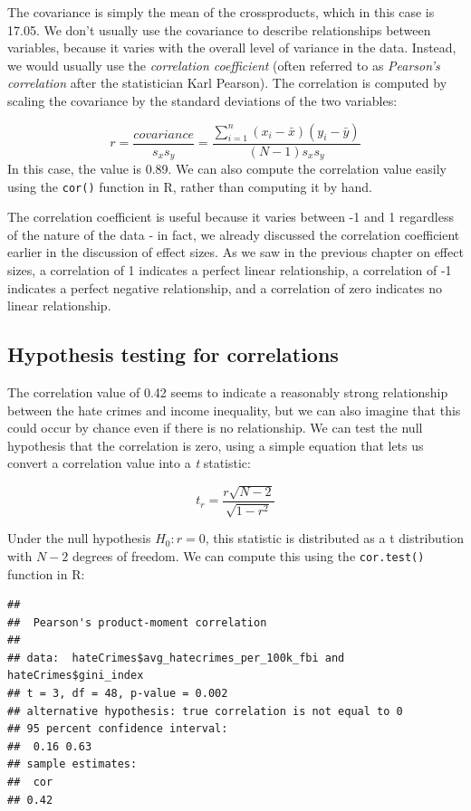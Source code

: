 \documentclass[12pt,]{book}
\theoremstyle{definition}
\theoremstyle{definition}
\theoremstyle{definition}
\theoremstyle{remark}
\begin{document}
The covariance is simply the mean of the crossproducts, which in this case is 17.05. We don't usually use the covariance to describe relationships between variables, because it varies with the overall level of variance in the data. Instead, we would usually use the \emph{correlation coefficient} (often referred to as \emph{Pearson's correlation} after the statistician Karl Pearson). The correlation is computed by scaling the covariance by the standard deviations of the two variables:

\[
r = \frac{covariance}{s_xs_y} = \frac{\sum_{i=1}^n (x_i - \bar{x})(y_i - \bar{y})}{(N - 1)s_x s_y}
\]
In this case, the value is 0.89. We can also compute the correlation value easily using the \texttt{cor()} function in R, rather than computing it by hand.

The correlation coefficient is useful because it varies between -1 and 1 regardless of the nature of the data - in fact, we already discussed the correlation coefficient earlier in the discussion of effect sizes. As we saw in the previous chapter on effect sizes, a correlation of 1 indicates a perfect linear relationship, a correlation of -1 indicates a perfect negative relationship, and a correlation of zero indicates no linear relationship.

\hypertarget{hypothesis-testing-for-correlations}{%
\subsection{Hypothesis testing for correlations}\label{hypothesis-testing-for-correlations}}

The correlation value of 0.42 seems to indicate a reasonably strong relationship between the hate crimes and income inequality, but we can also imagine that this could occur by chance even if there is no relationship. We can test the null hypothesis that the correlation is zero, using a simple equation that lets us convert a correlation value into a \emph{t} statistic:

\[
\textit{t}_r =  \frac{r\sqrt{N-2}}{\sqrt{1-r^2}}
\]

Under the null hypothesis \(H_0:r=0\), this statistic is distributed as a t distribution with \(N - 2\) degrees of freedom. We can compute this using the \texttt{cor.test()} function in R:

\begin{verbatim}
## 
##  Pearson's product-moment correlation
## 
## data:  hateCrimes$avg_hatecrimes_per_100k_fbi and hateCrimes$gini_index
## t = 3, df = 48, p-value = 0.002
## alternative hypothesis: true correlation is not equal to 0
## 95 percent confidence interval:
##  0.16 0.63
## sample estimates:
##  cor 
## 0.42
\end{verbatim}
\end{document}
